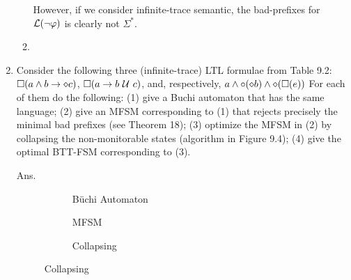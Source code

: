 \begin{enumerate}
\begin{enumerate}[(1)]
However, if we consider infinite-trace semantic,
the bad-prefixes for $\mathcal{L}(\neg\varphi)$ is clearly not $\Sigma^*$.

\item 

\end{enumerate}


\item Consider the following three (infinite-trace) LTL formulae from Table 9.2:
$\square(a\land b \to \diamond c)$, $\square(a \to b \ \mathcal{U}\  c)$, and,
respectively, $a\land\circ(\diamond b)\land \diamond(\square(e))$
For each of them do the following:
(1) give a Buchi automaton that has the same language;
(2) give an MFSM corresponding to (1) that rejects precisely the minimal bad
prefixes (see Theorem 18);
(3) optimize the MFSM in (2) by collapsing the non-monitorable states (algorithm
in Figure 9.4);
(4) give the optimal BTT-FSM corresponding to (3).

Ans.

\renewcommand{\thesubfigure}{\arabic{subfigure}}
\begin{figure}[H]
	\centering
	\caption{$\square(a\land b \to \diamond c)$}
\begin{subfigure}[t]{0.35\textwidth}
	\centering
	\caption{B\"uchi Automaton}
\end{subfigure}
\begin{subfigure}[t]{0.35\textwidth}
	\centering
	\caption{MFSM}
\end{subfigure}
\begin{subfigure}[t]{0.2\textwidth}
	\caption{Collapsing}
	\centering
\end{subfigure}
\end{figure}
\end{enumerate}
